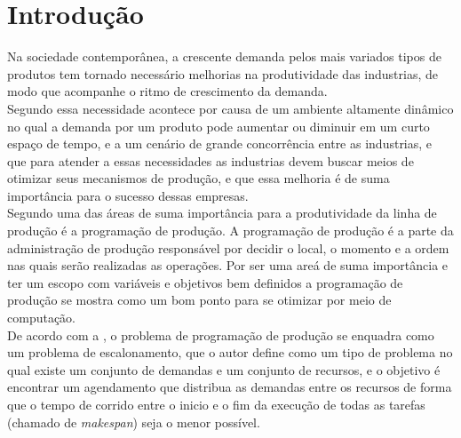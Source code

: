 \chapter{Introdução}

Na sociedade contemporânea, a crescente demanda pelos mais variados tipos de produtos tem tornado necessário melhorias na produtividade das industrias, de modo que acompanhe o ritmo de crescimento da demanda.\\
Segundo \citeauthor{Wari2016} essa necessidade acontece por causa de um ambiente altamente dinâmico no qual a demanda por um produto pode aumentar ou diminuir em um curto espaço de tempo, e a um cenário de grande concorrência entre as industrias, e que para atender a essas necessidades as industrias devem buscar meios de otimizar seus mecanismos de produção, e que essa melhoria é de suma importância para o sucesso dessas empresas.\\

Segundo \citeauthor{xhafa2008} uma das áreas de suma importância para a produtividade da linha de produção é a programação de produção. 
A programação de produção é a parte da administração de produção responsável por decidir o local, o momento e a ordem nas quais serão realizadas as operações. 
Por ser uma areá de suma importância e ter um escopo com variáveis e objetivos bem definidos a programação de produção se mostra como um bom ponto para se otimizar por meio de computação.\\

De acordo com a \citeauthor{Bagchi1999}, o problema de programação de produção se enquadra como um problema de escalonamento, que o autor define como um tipo de problema no qual existe um conjunto de demandas e um conjunto de recursos, e o objetivo é encontrar um agendamento que distribua as demandas entre os recursos de forma que o tempo de corrido entre o inicio e o fim da execução de todas as tarefas (chamado de \textit{makespan}) seja o menor possível.\\

